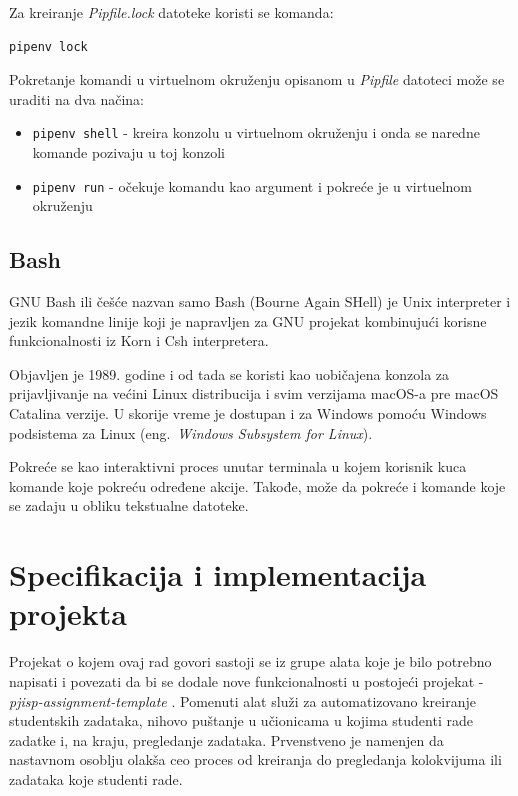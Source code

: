 \documentclass[12pt]{report}
\begin{document}
Za kreiranje \textit{Pipfile.lock} datoteke koristi se komanda:

\begin{verbatim}
pipenv lock
\end{verbatim}

Pokretanje komandi u virtuelnom okruženju opisanom u \textit{Pipfile} datoteci može se uraditi na dva načina:

\begin{itemize}
    \item \texttt{pipenv shell} - kreira konzolu u virtuelnom okruženju i onda se naredne komande pozivaju u toj konzoli
    \item \texttt{pipenv run} - očekuje komandu kao argument i pokreće je u virtuelnom okruženju
\end{itemize}

\section{Bash}

GNU Bash \cite{bash} ili češće nazvan samo Bash (Bourne Again SHell) je Unix interpreter i jezik komandne linije koji je napravljen za GNU projekat kombinujući korisne funkcionalnosti iz Korn i Csh interpretera.

Objavljen je 1989. godine i od tada se koristi kao uobičajena konzola za prijavljivanje na većini Linux distribucija i svim verzijama macOS-a pre macOS Catalina verzije. U skorije vreme je dostupan i za Windows pomoću Windows podsistema za Linux (eng.\ \textit{Windows Subsystem for Linux}).

Pokreće se kao interaktivni proces unutar terminala u kojem korisnik kuca komande koje pokreću određene akcije. Takođe, može da pokreće i komande koje se zadaju u obliku tekstualne datoteke.

\chapter{Specifikacija i implementacija projekta}

Projekat o kojem ovaj rad govori sastoji se iz grupe alata koje je bilo potrebno napisati i povezati da bi se dodale nove funkcionalnosti u postojeći projekat - \textit{pjisp-assignment-template} \cite{pjisp-assignment-template}. Pomenuti alat služi za automatizovano kreiranje studentskih zadataka, nihovo puštanje u učionicama u kojima studenti rade zadatke i, na kraju, pregledanje zadataka. Prvenstveno je namenjen da nastavnom osoblju olakša ceo proces od kreiranja do pregledanja kolokvijuma ili zadataka koje studenti rade.
\end{document}
